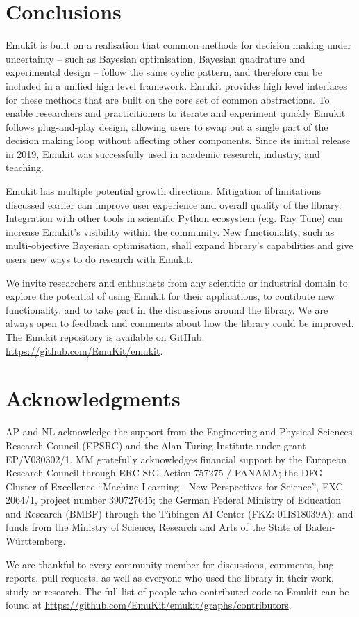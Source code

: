 \section{Conclusions}
Emukit is built on a realisation that common methods for decision making under uncertainty -- such as Bayesian optimisation, Bayesian quadrature and experimental design -- follow the same cyclic pattern, and therefore can be included in a unified high level framework. Emukit provides high level interfaces for these methods that are built on the core set of common abstractions. To enable researchers and practicitioners to iterate and experiment quickly Emukit follows plug-and-play design, allowing users to swap out a single part of the decision making loop without affecting other components. Since its initial release in 2019, Emukit was successfully used in academic research, industry, and teaching.

Emukit has multiple potential growth directions. Mitigation of limitations discussed earlier can improve user experience and overall quality of the library. Integration with other tools in scientific Python ecosystem (e.g. Ray Tune) can increase Emukit's visibility within the community. New functionality, such as multi-objective Bayesian optimisation, shall expand library's capabilities and give users new ways to do research with Emukit.

We invite researchers and enthusiasts from any scientific or industrial domain to explore the potential of using Emukit for their applications, to contibute new functionality, and to take part in the discussions around the library. We are always open to feedback and comments about how the library could be improved. The Emukit repository is available on GitHub: \url{https://github.com/EmuKit/emukit}.

\section{Acknowledgments}
AP and NL acknowledge the support from the Engineering and Physical Sciences Research Council (EPSRC) and the Alan Turing Institute under grant EP/V030302/1. MM gratefully acknowledges financial support by the European Research Council through ERC StG Action 757275 / PANAMA; the DFG Cluster of Excellence “Machine Learning - New Perspectives for Science”, EXC 2064/1, project number 390727645; the German Federal Ministry of Education and Research (BMBF) through the T\"{u}bingen AI Center (FKZ: 01IS18039A); and funds from the Ministry of Science, Research and Arts of the State of Baden-W\"{u}rttemberg.

We are thankful to every community member for discussions, comments, bug reports, pull requests, as well as everyone who used the library in their work, study or research. The full list of people who contributed code to Emukit can be found at \url{https://github.com/EmuKit/emukit/graphs/contributors}.
